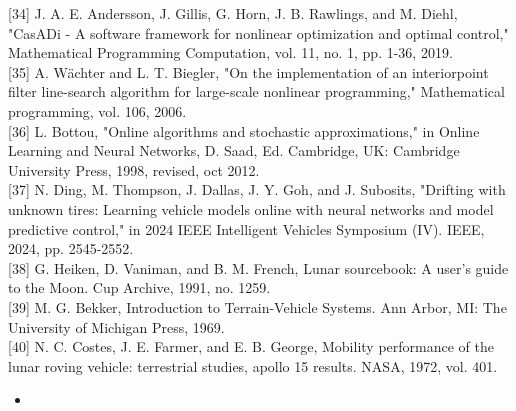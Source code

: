 \documentclass[10pt]{article}
\begin{document}
[34] J. A. E. Andersson, J. Gillis, G. Horn, J. B. Rawlings, and M. Diehl, "CasADi - A software framework for nonlinear optimization and optimal control," Mathematical Programming Computation, vol. 11, no. 1, pp. 1-36, 2019.\\[0pt]
[35] A. Wächter and L. T. Biegler, "On the implementation of an interiorpoint filter line-search algorithm for large-scale nonlinear programming," Mathematical programming, vol. 106, 2006.\\[0pt]
[36] L. Bottou, "Online algorithms and stochastic approximations," in Online Learning and Neural Networks, D. Saad, Ed. Cambridge, UK: Cambridge University Press, 1998, revised, oct 2012.\\[0pt]
[37] N. Ding, M. Thompson, J. Dallas, J. Y. Goh, and J. Subosits, "Drifting with unknown tires: Learning vehicle models online with neural networks and model predictive control," in 2024 IEEE Intelligent Vehicles Symposium (IV). IEEE, 2024, pp. 2545-2552.\\[0pt]
[38] G. Heiken, D. Vaniman, and B. M. French, Lunar sourcebook: A user's guide to the Moon. Cup Archive, 1991, no. 1259.\\[0pt]
[39] M. G. Bekker, Introduction to Terrain-Vehicle Systems. Ann Arbor, MI: The University of Michigan Press, 1969.\\[0pt]
[40] N. C. Costes, J. E. Farmer, and E. B. George, Mobility performance of the lunar roving vehicle: terrestrial studies, apollo 15 results. NASA, 1972, vol. 401.

\begin{itemize}
  \item 
\end{itemize}
\end{document}
